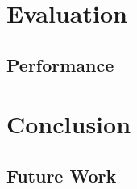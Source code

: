 \documentclass[bsc,logo,frontabs,twoside,singlespacing,normalheadings,parskip]{infthesis}     %
\begin{document}


\chapter{Evaluation}

\section{Performance}




\chapter{Conclusion}

\section{Future Work}




\end{document}
